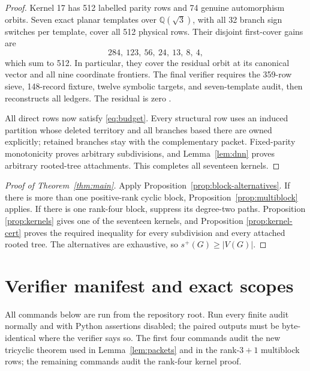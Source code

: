 \documentclass[11pt]{article}
\theoremstyle{remark}
\newcommand{\splus}{s^+}
\begin{document}
\begin{proof}
Kernel 17 has 512 labelled parity rows and 74 genuine automorphism orbits.
Seven exact planar templates over $\mathbb Q(\sqrt3)$, with all 32 branch sign
switches per template, cover all 512 physical rows.  Their disjoint first-cover
gains are
\[
 284,\ 123,\ 56,\ 24,\ 13,\ 8,\ 4,
\]
which sum to 512.  In particular, they cover the residual orbit at its
canonical vector and all nine coordinate frontiers.  The final verifier
requires the 359-row sieve, 148-record fixture, twelve symbolic targets, and
seven-template audit, then reconstructs all ledgers.  The residual is zero
\cite{CubicFinal}.

All direct rows now satisfy \eqref{eq:budget}.  Every structural row uses an
induced partition whose deleted territory and all branches based there are
owned explicitly; retained branches stay with the complementary packet.
Fixed-parity monotonicity proves arbitrary subdivisions, and
Lemma~\ref{lem:dnn} proves arbitrary rooted-tree attachments.  This completes
all seventeen kernels.
\end{proof}

\begin{proof}[Proof of Theorem~\ref{thm:main}]
Apply Proposition~\ref{prop:block-alternatives}.  If there is more than one
positive-rank cyclic block, Proposition~\ref{prop:multiblock} applies.  If
there is one rank-four block, suppress its degree-two paths.  Proposition
\ref{prop:kernels} gives one of the seventeen kernels, and Proposition
\ref{prop:kernel-cert} proves the required inequality for every subdivision
and every attached rooted tree.  The alternatives are exhaustive, so
$\splus(G)\geq|V(G)|$.
\end{proof}

\appendix
\section{Verifier manifest and exact scopes}\label{app:verify}

All commands below are run from the repository root.  Run every finite audit
normally and with Python assertions disabled; the paired outputs must be
byte-identical where the verifier says so.  The first four commands audit the
new tricyclic theorem used in Lemma~\ref{lem:packets} and in the rank-$3+1$
multiblock rows; the remaining commands audit the rank-four kernel proof.
\end{document}
